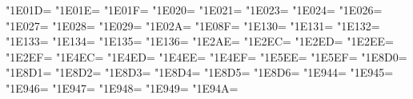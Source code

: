 \XeTeXcharclass"1E01D=\KclassCM
\XeTeXcharclass"1E01E=\KclassCM
\XeTeXcharclass"1E01F=\KclassCM
\XeTeXcharclass"1E020=\KclassCM
\XeTeXcharclass"1E021=\KclassCM
\XeTeXcharclass"1E023=\KclassCM
\XeTeXcharclass"1E024=\KclassCM
\XeTeXcharclass"1E026=\KclassCM
\XeTeXcharclass"1E027=\KclassCM
\XeTeXcharclass"1E028=\KclassCM
\XeTeXcharclass"1E029=\KclassCM
\XeTeXcharclass"1E02A=\KclassCM
\XeTeXcharclass"1E08F=\KclassCM
\XeTeXcharclass"1E130=\KclassCM
\XeTeXcharclass"1E131=\KclassCM
\XeTeXcharclass"1E132=\KclassCM
\XeTeXcharclass"1E133=\KclassCM
\XeTeXcharclass"1E134=\KclassCM
\XeTeXcharclass"1E135=\KclassCM
\XeTeXcharclass"1E136=\KclassCM
\XeTeXcharclass"1E2AE=\KclassCM
\XeTeXcharclass"1E2EC=\KclassCM
\XeTeXcharclass"1E2ED=\KclassCM
\XeTeXcharclass"1E2EE=\KclassCM
\XeTeXcharclass"1E2EF=\KclassCM
\XeTeXcharclass"1E4EC=\KclassCM
\XeTeXcharclass"1E4ED=\KclassCM
\XeTeXcharclass"1E4EE=\KclassCM
\XeTeXcharclass"1E4EF=\KclassCM
\XeTeXcharclass"1E5EE=\KclassCM
\XeTeXcharclass"1E5EF=\KclassCM
\XeTeXcharclass"1E8D0=\KclassCM
\XeTeXcharclass"1E8D1=\KclassCM
\XeTeXcharclass"1E8D2=\KclassCM
\XeTeXcharclass"1E8D3=\KclassCM
\XeTeXcharclass"1E8D4=\KclassCM
\XeTeXcharclass"1E8D5=\KclassCM
\XeTeXcharclass"1E8D6=\KclassCM
\XeTeXcharclass"1E944=\KclassCM
\XeTeXcharclass"1E945=\KclassCM
\XeTeXcharclass"1E946=\KclassCM
\XeTeXcharclass"1E947=\KclassCM
\XeTeXcharclass"1E948=\KclassCM
\XeTeXcharclass"1E949=\KclassCM
\XeTeXcharclass"1E94A=\KclassCM

